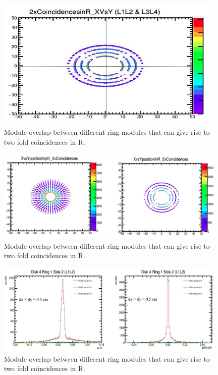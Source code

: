 \begin{figure}[!htp]
\centering
\includegraphics[width=1\textwidth]{ashish_thesis/l1l2_l3l4_2xinr.png}
\caption{%
   Module overlap between different ring modules that can give rise to two fold coincidences in R.
}
\label{fig:cluster_ring}
\end{figure}


\begin{figure}[!htp]
\centering
\includegraphics[width=1\textwidth]{ashish_thesis/XY_map_2xinphi_2xinr.png}
\caption{%
   Module overlap between different ring modules that can give rise to two fold coincidences in R.
}
\label{fig:cluster_ring}
\end{figure}



\begin{figure}[!htp]
\centering
\includegraphics[width=1\textwidth]{ashish_thesis/l1l2_dr_dphi_D4R1S2.png}
\caption{%
   Module overlap between different ring modules that can give rise to two fold coincidences in R.
}
\label{fig:cluster_ring}
\end{figure}


